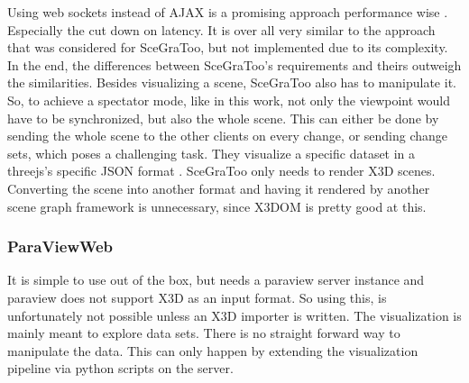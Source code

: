 Using web sockets instead of AJAX is a promising approach performance wise
\cite{Marion:2012:RCS:2338714.2338721}. Especially the cut down on latency. It is
over all very similar to the approach that was considered for SceGraToo, but not
implemented due to its complexity. In the end, the differences between
SceGraToo's requirements and theirs outweigh the similarities. Besides visualizing a scene,
\gls{SceGraToo} also has to manipulate it. So, to achieve a spectator mode,
like in this work, not only the viewpoint would have to be synchronized, but also
the whole scene. This can either be done by sending the whole scene to the other
clients on every change, or sending change sets, which poses a challenging task.
They visualize a specific dataset in a threejs's specific \gls{JSON} format
\cite{threejs-format}. \gls{SceGraToo} only needs to render \gls{X3D} scenes. Converting the
scene into another format and having it rendered by another scene graph framework
is unnecessary, since X3DOM is pretty good at this.

\subsubsection{ParaViewWeb}
\label{paraviewweb-pvweb}

It is simple to use out of the box, but needs a paraview server instance and
paraview does not support \gls{X3D} as an input format. So using this, is unfortunately
not possible unless an X3D importer is written. The visualization is
mainly meant to explore data sets. There is no straight forward way to manipulate
the data. This can only happen by extending the visualization
pipeline via python scripts on the server. \cite{paraviewweb}
